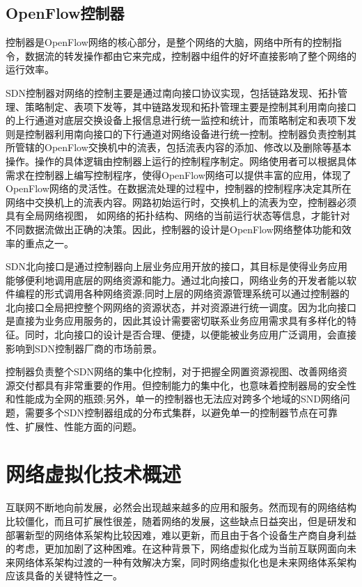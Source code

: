 \subsection{OpenFlow控制器}
控制器是OpenFlow网络的核心部分，是整个网络的大脑，网络中所有的控制指令，数据流的转发操作都由它来完成，控制器中组件的好坏直接影响了整个网络的运行效率。


SDN控制器对网络的控制主要是通过南向接口协议实现，包括链路发现、拓扑管理、策略制定、表项下发等，其中链路发现和拓扑管理主要是控制其利用南向接口的上行通道对底层交换设备上报信息进行统一监控和统计，而策略制定和表项下发则是控制器利用南向接口的下行通道对网络设备进行统一控制。控制器负责控制其所管辖的OpenFlow交换机中的流表，包括流表内容的添加、修改以及删除等基本操作。操作的具体逻辑由控制器上运行的控制程序制定。网络使用者可以根据具体需求在控制器上编写控制程序，使得OpenFlow网络可以提供丰富的应用，体现了 OpenFlow网络的灵活性。在数据流处理的过程中，控制器的控制程序决定其所在网络中交换机上的流表内容。网路初始运行时，交换机上的流表为空，控制器必须具有全局网络视图， 如网络的拓扑结构、网络的当前运行状态等信息，才能针对不同数据流做出正确的决策。因此，控制器的设计是OpenFlow网络整体功能和效率的重点之一。

SDN北向接口是通过控制器向上层业务应用开放的接口，其目标是使得业务应用能够便利地调用底层的网络资源和能力。通过北向接口，网络业务的开发者能以软件编程的形式调用各种网络资源;同时上层的网络资源管理系统可以通过控制器的北向接口全局把控整个网网络的资源状态，并对资源进行统一调度。因为北向接口是直接为业务应用服务的，因此其设计需要密切联系业务应用需求具有多样化的特征。同时，北向接口的设计是否合理、便捷，以便能被业务应用广泛调用，会直接影响到SDN控制器厂商的市场前景。

控制器负责整个SDN网络的集中化控制，对于把握全网置资源视图、改善网络资源交付都具有非常重要的作用。但控制能力的集中化，也意味着控制器局的安全性和性能成为全网的瓶颈;另外，单一的控制器也无法应对跨多个地域的SND网络问题，需要多个SDN控制器组成的分布式集群，以避免单一的控制器节点在可靠性、扩展性、性能方面的问题。
\section{网络虚拟化技术概述}
互联网不断地向前发展，必然会出现越来越多的应用和服务。然而现有的网络结构比较僵化，而且可扩展性很差，随着网络的发展，这些缺点日益突出，但是研发和部署新型的网络体系架构比较因难，难以更新，而且由于各个设备生产商自身利益的考虑，更加加剧了这种困难。在这种背景下，网络虚拟化成为当前互联网面向未来网络体系架构过渡的一种有效解决方案，同时网络虚拟化也是未来网络体系架构应该具备的关键特性之一。

